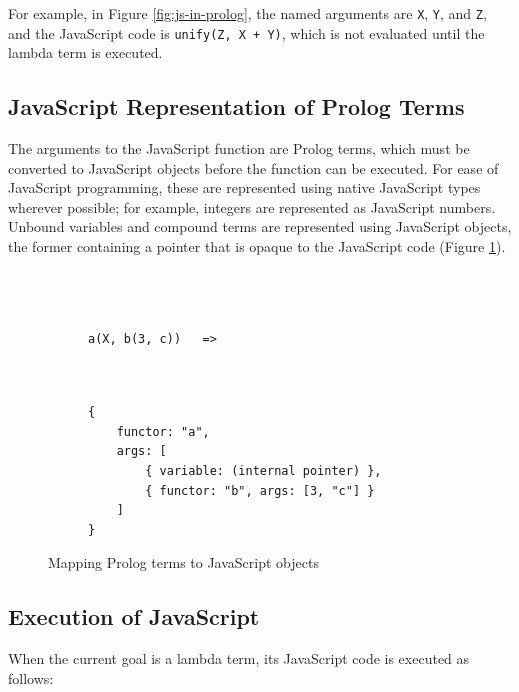 For example, in Figure \ref{fig:js-in-prolog}, the named arguments are \texttt{X}, \texttt{Y}, and \texttt{Z}, and the JavaScript code is \texttt{unify(Z, X + Y)}, which is not evaluated until the lambda term is executed.

\subsection{JavaScript Representation of Prolog Terms}

\label{sec:js-prolog-mapping}

The arguments to the JavaScript function are Prolog terms, which must be converted to JavaScript objects before the function can be executed. For ease of JavaScript programming, these are represented using native JavaScript types wherever possible; for example, integers are represented as JavaScript numbers. Unbound variables and compound terms are represented using JavaScript objects, the former containing a pointer that is opaque to the JavaScript code (Figure \ref{fig:prolog-js-mapping}).

\begin{figure}[H]
\centering
\begin{subfigure}{0.3\textwidth}
\centering
\begin{verbatim}



a(X, b(3, c))   =>



\end{verbatim}
\end{subfigure}%
\begin{subfigure}{0.7\textwidth}
\centering
\begin{verbatim}
{
    functor: "a",
    args: [
        { variable: (internal pointer) },
        { functor: "b", args: [3, "c"] }
    ]
}
\end{verbatim}
\end{subfigure}
\caption{Mapping Prolog terms to JavaScript objects}
\label{fig:prolog-js-mapping}
\end{figure}

\subsection{Execution of JavaScript}

When the current goal is a lambda term, its JavaScript code is executed as follows:

